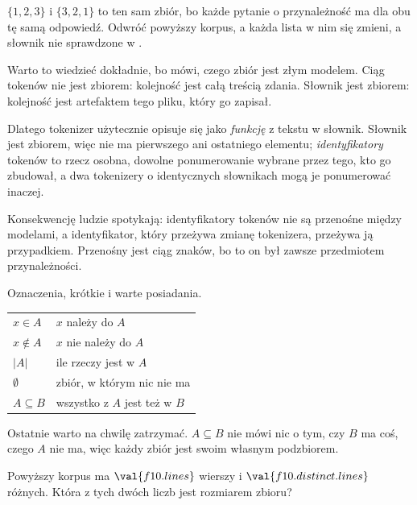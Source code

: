 \begin{fr}
$\{1, 2, 3\}$ i $\{3, 2, 1\}$ to ten sam zbiór, bo każde pytanie o
przynależność ma dla obu tę samą odpowiedź. Odwróć powyższy korpus, a każda
lista w nim się zmieni, a słownik nie \dash{} sprawdzone w
.

Warto to wiedzieć dokładnie, bo mówi, czego zbiór jest złym modelem. Ciąg
tokenów nie jest zbiorem: kolejność jest całą treścią zdania. Słownik jest
zbiorem: kolejność jest artefaktem tego pliku, który go zapisał.

\begin{aibox}
Dlatego tokenizer użytecznie opisuje się jako \emph{funkcję} z tekstu w
słownik. Słownik jest zbiorem, więc nie ma pierwszego ani ostatniego elementu;
\emph{identyfikatory} tokenów to rzecz osobna, dowolne ponumerowanie wybrane
przez tego, kto go zbudował, a dwa tokenizery o identycznych słownikach mogą je
ponumerować inaczej.

Konsekwencję ludzie spotykają: identyfikatory tokenów nie są przenośne między
modelami, a identyfikator, który przeżywa zmianę tokenizera, przeżywa ją
przypadkiem. Przenośny jest ciąg znaków, bo to on był zawsze przedmiotem
przynależności.
\end{aibox}
\end{fr}

\begin{fr}
Oznaczenia, krótkie i warte posiadania.

\begin{center}
\begin{tabular}{ll}
\toprule
$x \in A$ & $x$ należy do $A$ \\
$x \notin A$ & $x$ nie należy do $A$ \\
$\lvert A \rvert$ & ile rzeczy jest w $A$ \\
$\emptyset$ & zbiór, w którym nic nie ma \\
$A \subseteq B$ & wszystko z $A$ jest też w $B$ \\
\bottomrule
\end{tabular}
\end{center}

Ostatnie warto na chwilę zatrzymać. $A \subseteq B$ nie mówi nic o tym, czy $B$
ma coś, czego $A$ nie ma, więc każdy zbiór jest swoim własnym podzbiorem.

Powyższy korpus ma $\val{f10.lines}$ wierszy i $\val{f10.distinct.lines}$
różnych. Która z tych dwóch liczb jest rozmiarem zbioru?
\nextframe
\end{fr}

